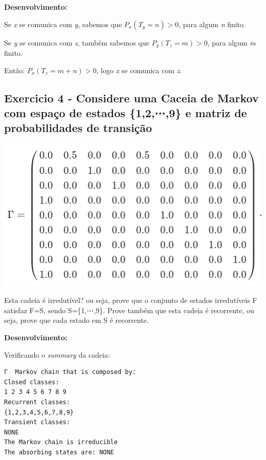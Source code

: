 \documentclass[
]{article}
\begin{document}
\textbf{Desenvolvimento:}

Se \emph{x} se comunica com \emph{y}, sabemos que \(P_{x}(T_{y}=n)>0\),
para algum \emph{n} finito.

Se \emph{y} se comunica com \emph{z}, também sabemos que
\(P_{y}(T_{z}=m)>0\), para algum \emph{m} finito.

Então: \(P_{x}(T_{z}=m+n)>0\), logo \emph{x} se comunica com \emph{z}.

\pagebreak

\hypertarget{exercicio-4---considere-uma-caceia-de-markov-com-espauxe7o-de-estados-129-e-matriz-de-probabilidades-de-transiuxe7uxe3o}{%
\subsection{Exercicio 4 - Considere uma Caceia de Markov com espaço de
estados \{1,2,⋯,9\} e matriz de probabilidades de
transição}\label{exercicio-4---considere-uma-caceia-de-markov-com-espauxe7o-de-estados-129-e-matriz-de-probabilidades-de-transiuxe7uxe3o}}

\includegraphics{Trabalho 03 - img4.png}

Esta cadeia é irredutível? ou seja, prove que o conjunto de estados
irredutíveis F satisfaz F=S, sendo S=\{1,⋯,9\}. Prove também que esta
cadeia é recorrente, ou seja, prove que cada estado em S é recorrente.

\textbf{Desenvolvimento:}

Verificando o \emph{summary} da cadeia:

\begin{verbatim}
Γ  Markov chain that is composed by: 
Closed classes: 
1 2 3 4 5 6 7 8 9 
Recurrent classes: 
{1,2,3,4,5,6,7,8,9}
Transient classes: 
NONE 
The Markov chain is irreducible 
The absorbing states are: NONE
\end{verbatim}
\end{document}
